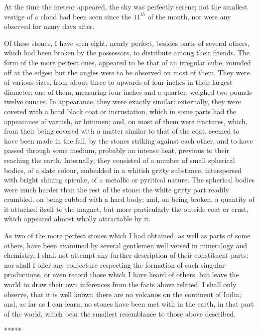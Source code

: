 \documentclass[a4paper, 12pt, oneside]{article}
\begin{document}
At the time the meteor appeared, the sky was perfectly serene; not the smallest vestige of a cloud had been seen since the $11^{th}$ of the month, nor were any observed for many days after.

Of these stones, I have seen eight, nearly perfect, besides parts of several others, which had been broken by the possessors, to distribute among their friends. The form of the more perfect ones, appeared to be that of an irregular cube, rounded off at the edges; but the angles were to be observed on most of them. They were of various sizes, from about three to upwards of four inches in their largest diameter; one of them, measuring four inches and a quarter, weighed two pounds twelve ounces. In appearance, they were exactly similar: externally, they were covered with a hard black coat or incrustation, which in some parts had the appearance of varnish, or bitumen; and, on most of them were fractures, which, from their being covered with a matter similar to that of the coat, seemed to have been made in the fall, by the stones striking against each other, and to have passed through some medium, probably an intense heat, previous to their reaching the earth. Internally, they consisted of a number of small spherical bodies, of a slate colour, embedded in a whitish gritty substance, interspersed with bright shining spiculæ, of a metallic or pyritical nature. The spherical bodies were much harder than the rest of the stone: the white gritty part readily crumbled, on being rubbed with a hard body; and, on being broken, a quantity of it attached itself to the magnet, but more particularly the outside coat or crust, which appeared almost wholly attractable by it.

As two of the more perfect stones which I had obtained, as well as parts of some others, have been examined by several gentlemen well versed in mineralogy and chemistry, I shall not attempt any further description of their constituent parts; nor shall I offer any conjecture respecting the formation of such singular productions, or even record those which I have heard of others, but leave the world to draw their own inferences from the facts above related. I shall only observe, that it is well known there are no volcanos on the continent of India; and, as far as I can learn, no stones have been met with in the earth, in that part of the world, which bear the smallest resemblance to those above described.

\centerline{*\hspace{15mm}*\hspace{15mm}*\hspace{15mm}*\hspace{15mm}*}
\bigskip
\end{document}
